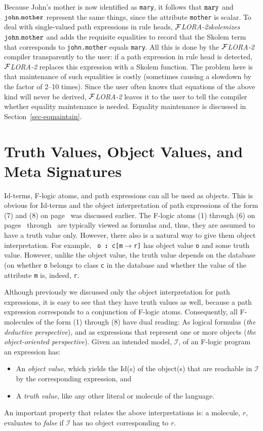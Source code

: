 \documentclass[11pt]{article}
\newcommand{\db}[1]{\ensuremath{\mathcal{#1}}}
\newcommand{\isa}{\,{\bf{:}}\,}
\newcommand{\fd}{\ensuremath{{\rightarrow}}}                   %
\newcommand{\FLORA}{{\mbox{${\cal F}${\small\it LORA}\rm\emph{-2}}}\xspace}
\newcommand{\fl}{\mbox{F-logic}\xspace}
\begin{document}
Because John's mother is now identified as {\tt mary}, it follows that
${\tt mary}$ and ${\tt john.mother}$ represent the same things, since the
attribute {\tt mother} is scalar. To deal with single-valued path
expressions in rule heads, \FLORA \emph{skolemizes} ${\tt john.mother}$ and
adds the requisite equalities to record that the Skolem term that
corresponds to {\tt john.mother} equals {\tt mary}.  All this is done by
the \FLORA compiler transparently to the user: if a path expression in rule
head is detected, \FLORA replaces this expression with a Skolem function.
The problem here is that maintenance of such equalities is costly
(sometimes causing a slowdown by the factor of 2--10 times). Since the user
often knows that equations of the above kind will never be derived, \FLORA
leaves it to the user to tell the compiler whether equality maintenance is
needed.  Equality maintenance is discussed in Section~\ref{sec-eqmaintain}.


\section{Truth Values, Object Values, and Meta Signatures}
\label{sec-references}


Id-terms, \fl atoms, and path expressions can all be used as objects. This
is obvious for Id-terms and the object interpretation of path expressions
of the form (7) and (8) on page~\pageref{eq-path-fun} was discussed
earlier. The \fl atoms (1) through (6) on pages~\pageref{eq-scalar-atom}
through~\pageref{eq-subclass} are typically viewed as formulas and, thus,
they are assumed to have a truth value only.  However, there also is a
natural way to give them object interpretation.  For example, {\tt
  o{\isa}c[m{\fd}r]} has object value {\tt o} and some truth value.
However, unlike the object value, the truth value depends on the database
(on whether {\tt o} belongs to class {\tt c} in the database and whether
the value of the attribute {\tt m} is, indeed, {\tt r}.

Although previously we discussed only the object interpretation for path
expressions, it is easy to see that they have truth values as well, because
a path expression corresponds to a conjunction of F-logic atoms.
Consequently, all F-molecules of the form (1) through (8) have dual
reading: As logical formulas (\emph{the deductive perspective}), and as
expressions that represent one or more objects (\emph{the object-oriented
  perspective}).  Given an intended model, \db I, of an \fl program an
expression has:
\begin{itemize}
\item An \emph{object value}, which yields the Id(s) of the object(s)
  that are reachable in \db I by the corresponding expression, and 
\item A \emph{truth value}, like any other literal or molecule of the
  language. 
\end{itemize}
An important property that relates the above interpretations is: a
molecule, $r$, evaluates to \emph{false} if \db I has no object
corresponding to $r$.
\end{document}
